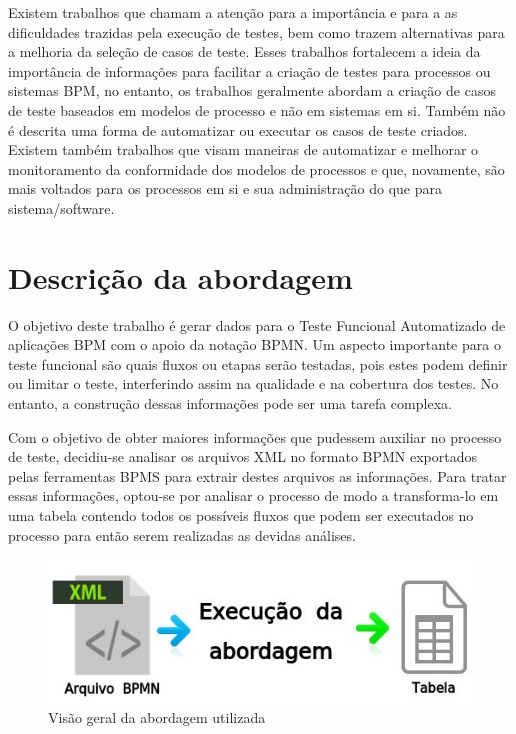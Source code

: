 \documentclass[12pt]{article}
\begin{document}
Existem trabalhos que chamam a atenção para a importância e para a as dificuldades trazidas pela execução de testes, bem como trazem alternativas para a melhoria da seleção de casos de teste\cite{bohmer2015genetic}. Esses trabalhos fortalecem a ideia da importância de informações para facilitar a criação de testes para processos ou sistemas BPM, no entanto, os trabalhos geralmente abordam a criação de casos de teste baseados em modelos de processo e não em sistemas em si. Também não é descrita uma forma de automatizar ou executar os casos de teste criados. Existem também trabalhos que visam maneiras de automatizar e melhorar o monitoramento da conformidade dos modelos de processos \cite{ly2015compliance,van2012replaying} e que, novamente, são mais voltados para os processos em si e sua administração do que para sistema/software.

\section{Descrição da abordagem}
O objetivo deste trabalho é gerar dados para o Teste Funcional Automatizado de aplicações BPM com o apoio da notação BPMN. Um aspecto importante para o teste funcional são quais fluxos ou etapas serão testadas, pois estes podem definir ou limitar o teste, interferindo assim na qualidade e na cobertura dos testes. No entanto, a construção dessas informações pode ser uma tarefa complexa.

Com o objetivo de obter maiores informações que pudessem auxiliar no processo de teste, decidiu-se analisar os arquivos XML no formato BPMN exportados pelas ferramentas BPMS para extrair destes arquivos as informações. Para tratar essas informações, optou-se por analisar o processo de modo a transforma-lo em uma tabela contendo todos os possíveis fluxos que podem ser executados no processo para então serem realizadas as devidas análises. 

\begin{figure}[ht]
\centering
\includegraphics[width=.8\textwidth]{figuras/abordagem1.png}
\caption{Visão geral da abordagem utilizada}
\label{fig:abordagem1}
\end{figure}
\end{document}
